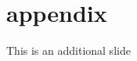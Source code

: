 \documentclass[aspectratio=169]{beamer}
\begin{document}
\backupbegin
\appendix

\section*{appendix}
\begin{frame}
This is an additional slide
\end{frame}

\backupend
\end{document}

